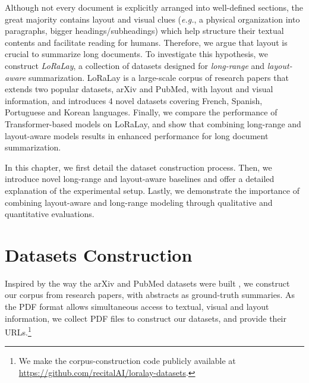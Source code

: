 Although not every document is explicitly arranged into well-defined sections, the great majority contains layout and visual clues (\textit{e.g.}, a physical organization into paragraphs, bigger headings/subheadings) which help structure their textual contents and facilitate reading for humans. Therefore, we argue that layout is crucial to summarize long documents. To investigate this hypothesis, we construct \emph{LoRaLay}, a collection of datasets designed for \textit{long-range} and \textit{layout-aware} summarization. LoRaLay is a large-scale corpus of research papers that extends two popular datasets, arXiv and PubMed, with layout and visual information, and introduces 4 novel datasets covering French, Spanish, Portuguese and Korean languages. Finally, we compare the performance of Transformer-based models on LoRaLay, and show that combining long-range and layout-aware models results in enhanced performance for long document summarization.

In this chapter, we first detail the dataset construction process. Then, we introduce novel long-range and layout-aware baselines and offer a detailed explanation of the experimental setup. Lastly, we demonstrate the importance of combining layout-aware and long-range modeling through qualitative and quantitative evaluations.

\section{Datasets Construction}

Inspired by the way the arXiv and PubMed datasets were built \citep{cohan2018discourse}, we construct our corpus from research papers, with abstracts as ground-truth summaries. As the PDF format allows simultaneous access to textual, visual and layout information, we collect PDF files to construct our datasets, and provide their URLs.\footnote{We make the corpus-construction code publicly available at \url{https://github.com/recitalAI/loralay-datasets}.}

